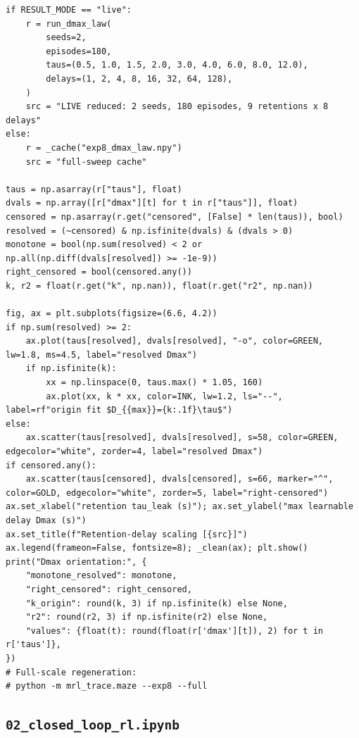 \begin{lstlisting}[caption={01\_trace\_and\_credit\_window.ipynb code cell 4},label={lst:mrl-nb-01-trace-and-credit-window-4}]
if RESULT_MODE == "live":
    r = run_dmax_law(
        seeds=2,
        episodes=180,
        taus=(0.5, 1.0, 1.5, 2.0, 3.0, 4.0, 6.0, 8.0, 12.0),
        delays=(1, 2, 4, 8, 16, 32, 64, 128),
    )
    src = "LIVE reduced: 2 seeds, 180 episodes, 9 retentions x 8 delays"
else:
    r = _cache("exp8_dmax_law.npy")
    src = "full-sweep cache"

taus = np.asarray(r["taus"], float)
dvals = np.array([r["dmax"][t] for t in r["taus"]], float)
censored = np.asarray(r.get("censored", [False] * len(taus)), bool)
resolved = (~censored) & np.isfinite(dvals) & (dvals > 0)
monotone = bool(np.sum(resolved) < 2 or np.all(np.diff(dvals[resolved]) >= -1e-9))
right_censored = bool(censored.any())
k, r2 = float(r.get("k", np.nan)), float(r.get("r2", np.nan))

fig, ax = plt.subplots(figsize=(6.6, 4.2))
if np.sum(resolved) >= 2:
    ax.plot(taus[resolved], dvals[resolved], "-o", color=GREEN, lw=1.8, ms=4.5, label="resolved Dmax")
    if np.isfinite(k):
        xx = np.linspace(0, taus.max() * 1.05, 160)
        ax.plot(xx, k * xx, color=INK, lw=1.2, ls="--", label=rf"origin fit $D_{{max}}={k:.1f}\tau$")
else:
    ax.scatter(taus[resolved], dvals[resolved], s=58, color=GREEN, edgecolor="white", zorder=4, label="resolved Dmax")
if censored.any():
    ax.scatter(taus[censored], dvals[censored], s=66, marker="^", color=GOLD, edgecolor="white", zorder=5, label="right-censored")
ax.set_xlabel("retention tau_leak (s)"); ax.set_ylabel("max learnable delay Dmax (s)")
ax.set_title(f"Retention-delay scaling [{src}]")
ax.legend(frameon=False, fontsize=8); _clean(ax); plt.show()
print("Dmax orientation:", {
    "monotone_resolved": monotone,
    "right_censored": right_censored,
    "k_origin": round(k, 3) if np.isfinite(k) else None,
    "r2": round(r2, 3) if np.isfinite(r2) else None,
    "values": {float(t): round(float(r['dmax'][t]), 2) for t in r['taus']},
})
# Full-scale regeneration:
# python -m mrl_trace.maze --exp8 --full
\end{lstlisting}

\subsection{\texttt{02\_closed\_loop\_rl.ipynb}}

